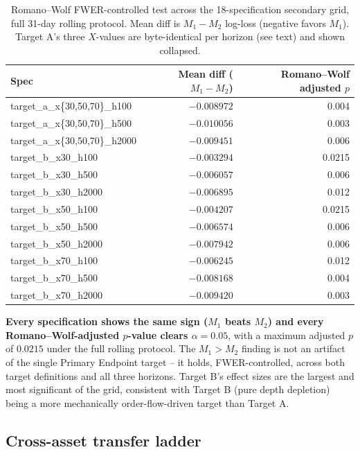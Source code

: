 \begin{table}[htbp]
\centering
\caption{Romano--Wolf FWER-controlled test across the 18-specification
secondary grid, full 31-day rolling protocol. Mean diff is $M_1 - M_2$
log-loss (negative favors $M_1$). Target A's three $X$-values are
byte-identical per horizon (see text) and shown collapsed.}
\label{tab:romano-wolf}
\begin{tabular}{@{}lrr@{}}
\toprule
Spec & Mean diff ($M_1-M_2$) & Romano--Wolf adjusted $p$ \\
\midrule
target\_a\_x\{30,50,70\}\_h100  & $-0.008972$ & 0.004 \\
target\_a\_x\{30,50,70\}\_h500  & $-0.010056$ & 0.003 \\
target\_a\_x\{30,50,70\}\_h2000 & $-0.009451$ & 0.006 \\
target\_b\_x30\_h100   & $-0.003294$ & 0.0215 \\
target\_b\_x30\_h500   & $-0.006057$ & 0.006 \\
target\_b\_x30\_h2000  & $-0.006895$ & 0.012 \\
target\_b\_x50\_h100   & $-0.004207$ & 0.0215 \\
target\_b\_x50\_h500   & $-0.006574$ & 0.006 \\
target\_b\_x50\_h2000  & $-0.007942$ & 0.006 \\
target\_b\_x70\_h100   & $-0.006245$ & 0.012 \\
target\_b\_x70\_h500   & $-0.008168$ & 0.004 \\
target\_b\_x70\_h2000  & $-0.009420$ & 0.003 \\
\bottomrule
\end{tabular}
\end{table}

\textbf{Every specification shows the same sign ($M_1$ beats $M_2$) and
every Romano--Wolf-adjusted $p$-value clears $\alpha=0.05$}, with a
maximum adjusted $p$ of $0.0215$ under the full rolling protocol. The
$M_1 > M_2$ finding is not an artifact of the single Primary Endpoint
target -- it holds, FWER-controlled, across both target definitions and
all three horizons. Target B's effect sizes are the largest and most
significant of the grid, consistent with Target B (pure depth depletion)
being a more mechanically order-flow-driven target than Target A.

\subsection{Cross-asset transfer ladder}
\label{sec:results-transfer}

